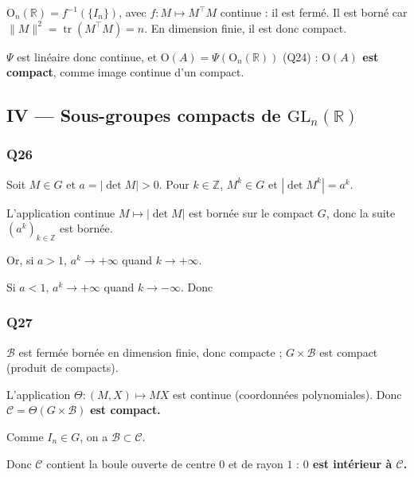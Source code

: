 \documentclass[11pt,a4paper]{article}
\newcommand{\equationajustee}[1]{%
  \sbox{\boiteequation}{$\displaystyle #1$}%
  \ifdim\wd\boiteequation>\linewidth
    \[\resizebox{\linewidth}{!}{\usebox{\boiteequation}}\]%
  \else
    \[#1\]%
  \fi}
\begin{document}
\({\mathrm{O}}_n(\mathbb{R})=f^{-1}(\{I_n\})\), avec \(f:M\mapsto M^\top M\) continue : il est fermé. Il est borné car \(\|M\|^2=\operatorname{tr}(M^\top M)=n\). En dimension finie, il est donc compact.

\(\Psi\) est linéaire donc continue, et \(\mathrm{O}(A)=\Psi({\mathrm{O}}_n(\mathbb{R}))\) (Q24) : \textbf{\(\mathrm{O}(A)\) est compact}, comme image continue d'un compact.

\hypertarget{iv-sous-groupes-compacts-de-mathrmgl_nmathbbr}{%
\subsection{\texorpdfstring{IV --- Sous-groupes compacts de \({\mathrm{GL}}_n(\mathbb{R})\)}{IV --- Sous-groupes compacts de \{\textbackslash mathrm\{GL\}\}\_n(\textbackslash mathbb\{R\})}}\label{iv-sous-groupes-compacts-de-mathrmgl_nmathbbr}}

\hypertarget{q26}{%
\subsubsection{Q26}\label{q26}}

Soit \(M\in G\) et \(a=|\det M|>0\). Pour \(k\in\mathbb{Z}\), \(M^k\in G\) et \(|\det M^k|=a^k\).

L'application continue \(M\mapsto|\det M|\) est bornée sur le compact \(G\), donc la suite \((a^k)_{k\in\mathbb{Z}}\) est bornée.

Or, si \(a>1\), \(a^k\to+\infty\) quand \(k\to+\infty\).

Si \(a<1\), \(a^k\to+\infty\) quand \(k\to-\infty\). Donc

\equationajustee{\boxed{\forall M\in G,\ |\det M|=1.}}

\hypertarget{q27}{%
\subsubsection{Q27}\label{q27}}

\(\mathcal{B}\) est fermée bornée en dimension finie, donc compacte ; \(G\times\mathcal{B}\) est compact (produit de compacts).

L'application \(\Theta:(M,X)\mapsto MX\) est continue (coordonnées polynomiales). Donc \(\mathcal{C}=\Theta(G\times\mathcal{B})\) \textbf{est compact.}

Comme \(I_n\in G\), on a \(\mathcal{B}\subset\mathcal{C}\).

Donc \(\mathcal{C}\) contient la boule ouverte de centre \(0\) et de rayon \(1\) : \textbf{\(0\) est intérieur à \(\mathcal{C}\).}
\end{document}
